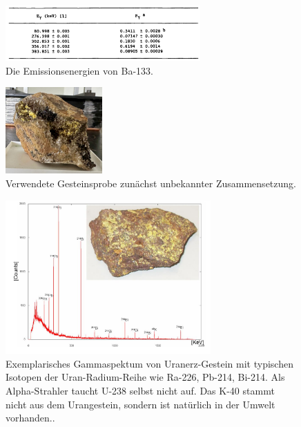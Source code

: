 \begin{figure}[H]
    \centering
    \includegraphics[width=0.666\textwidth]{content/grafik/baenergien.jpg}
    \caption{Die Emissionsenergien von Ba-133. \cite{Kalibration}}
    \label{fig:baE}
\end{figure}

\begin{figure}[H]
    \centering
    \includegraphics[width=0.33\textwidth]{content/grafik/unbekannt.jpg}
    \caption{Verwendete Gesteinsprobe zunächst unbekannter Zusammensetzung.}
    \label{fig:unbekannt}
\end{figure}

\begin{figure}[H]
    \centering
    \includegraphics[width=0.7\textwidth]{content/grafik/Gammaspektrum_Uranerz.jpg}
    \caption{Exemplarisches Gammaspektum von Uranerz-Gestein mit typischen Isotopen der Uran-Radium-Reihe
             wie Ra-226, Pb-214, Bi-214. Als Alpha-Strahler taucht U-238 selbst nicht auf. Das K-40 stammt
             nicht aus dem Urangestein, sondern ist natürlich in der Umwelt vorhanden.. \cite{gamma_uran}}
    \label{fig:SpekU}
\end{figure}

